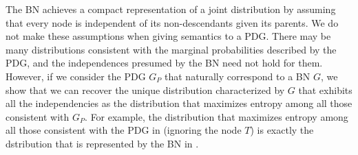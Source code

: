 \documentclass{article}
\newcommand{\MN}{PDG}
\numberwithin{equation}{section}
\begin{document}
\begin{example}
		The BN achieves a compact representation of a joint
        distribution by assuming that every
                node is independent of its non-descendants given its
                parents. 
%
We do not make these assumptions when giving semantics to a PDG.
There may be many distributions consistent with the marginal
probabilities described by the PDG, and the independences presumed by
the BN need not hold for them.   However, if we consider the PDG $G_P$
that naturally correspond to a BN $G$, we show that we can recover the
unique distribution characterized by $G$ that exhibits all the
independencies as the distribution that maximizes entropy among 
all those consistent with $G_P$.   
For example, the distribution that maximizes entropy among all those
consistent with the PDG in 
 (ignoring the node $T$)
is exactly the dstribution that is represented by the BN in
.  
				

\end{example}
\end{document}

